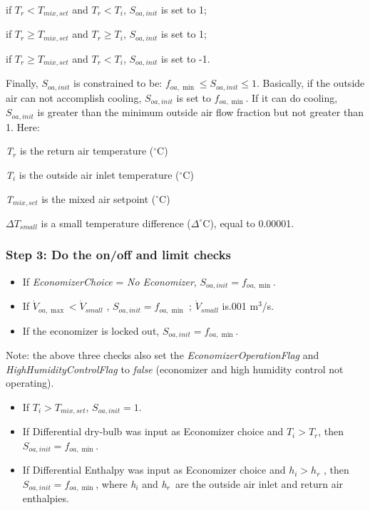 if \({T_r} < {T_{mix,set}}\) and \({T_r} < {T_i}\), \({S_{oa,init}}\) is set to 1;

if \({T_r} \ge {T_{mix,set}}\) and \({T_r} \ge {T_i}\), \({S_{oa,init}}\) is set to 1;

if \({T_r} \ge {T_{mix,set}}\) and \({T_r} < {T_i}\), \({S_{oa,init}}\) is set to -1.

Finally, \({S_{oa,init}}\) is constrained to be: \({f_{oa,\min }} \le {S_{oa,init}} \le 1\). Basically, if the outside air can not accomplish cooling, \({S_{oa,init}}\) is set to \({f_{oa,\min }}\). If it can do cooling, \({S_{oa,init}}\) is greater than the minimum outside air flow fraction but not greater than 1. Here:

\emph{T\(_{r}\)} is the return air temperature (\(^{\circ}\)C)

\emph{T\(_{i}\)} is the outside air inlet temperature (\(^{\circ}\)C)

\emph{T\(_{mix,set}\)} is the mixed air setpoint (\(^{\circ}\)C)

\emph{\(\Delta {T_{small}}\)} is a small temperature difference (\(\Delta^{\circ}\)C), equal to 0.00001.

\subsubsection{Step 3: Do the on/off and limit checks}\label{step-3-Do-the-onoff-and-limit-checks}

\begin{itemize}
\item
If \emph{EconomizerChoice} = \emph{No Economizer}, \({S_{oa,init}} = {f_{oa,\min }}\).
\item
If \({\dot V_{oa,\max }} < {\dot V_{small}}\) , \({S_{oa,init}} = {f_{oa,\min }}\) ; \({\dot V_{small}}\) is.001 m\(^{3}\)/s.
\item
If the economizer is locked out, \({S_{oa,init}} = {f_{oa,\min }}\).
\end{itemize}

Note: the above three checks also set the \emph{EconomizerOperationFlag} and \emph{HighHumidityControlFlag} to \emph{false} (economizer and high humidity control not operating).

\begin{itemize}
\item If \({T_i} > {T_{mix,set}}\), \({S_{oa,init}} = 1\).
\item If Differential dry-bulb was input as Economizer choice and \({T_i} > {T_r}\), then \({S_{oa,init}} = {f_{oa,\min }}\).
\item If Differential Enthalpy was input as Economizer choice and \({h_i} > {h_r}\) , then \({S_{oa,init}} = {f_{oa,\min }}\), where \emph{h\(_{i}\)} and \emph{h\(_{r}\)}~are the outside air inlet and return air enthalpies.
\end{itemize}

